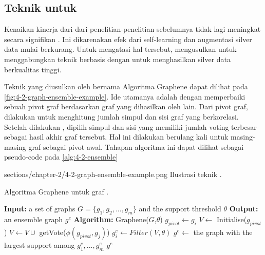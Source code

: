 \subsection{Teknik  untuk \amrparsing{}}

Kenaikan kinerja dari \amrparsing{} dari penelitian-penelitian sebelumnya tidak lagi meningkat secara signifikan .
Ini dikarenakan efek dari self-learning dan augmentasi silver data mulai berkurang.
Untuk mengatasi hal tersebut, \textcite{lee2022} mengusulkan untuk menggabungkan teknik  berbasis \SMATCH{}  dengan  untuk menghasilkan silver data berkualitas tinggi.

Teknik  yang diusulkan oleh \textcite{hoang2021} bernama Algoritma Graphene dapat dilihat pada \cref{fig:4-2-graph-ensemble-example}.
Ide utamanya adalah dengan memperbaiki sebuah pivot graf berdasarkan graf yang dihasilkan oleh  lain.
Dari pivot graf, dilakukan  untuk menghitung jumlah simpul dan sisi graf yang berkorelasi.
Setelah dilakukan , dipilih simpul dan sisi yang memiliki jumlah voting terbesar sebagai hasil akhir graf tersebut.
Hal ini dilakukan berulang kali untuk masing-masing graf sebagai pivot awal.
Tahapan algoritma ini dapat dilihat sebagai pseudo-code pada \cref{alg:4-2-ensemble}

  {sections/chapter-2/4-2-graph-ensemble-example.png}
  {Ilustrasi teknik  .}

\begin{algorithm}
  \caption{Algoritma Graphene untuk  graf .}
  \label{alg:4-2-ensemble}
  \begin{algorithmic}
    \State \textbf{Input:} a set of graphs $G = \{g_1, g_2, ..., g_m\}$ and the support threshold $\theta$
    \State \textbf{Output:} an ensemble graph $g^e$
    \State \textbf{Algorithm:} Graphene($G$,$\theta$)
      \State $g_{pivot} \gets g_i$
      \State $V \gets$ Initialise($g_{pivot}$)
          \State $V \gets V \cup$ getVote($\phi(g_{pivot},g_j)$)
        \EndIf
      \EndFor
      \State $g^e_i \gets Filter(V,\theta)$
    \EndFor
    \State $g^e \gets$ the graph with the largest support among $g^e_1,...,g^e_m$
    \State \Return $g^e$
  \end{algorithmic}
\end{algorithm}

